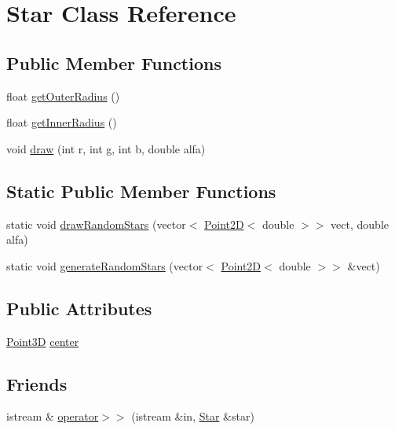 \hypertarget{class_star}{\section{Star Class Reference}
\label{class_star}
}
\subsection*{Public Member Functions}
\begin{DoxyCompactItemize}
\item 
float \hyperlink{class_star_a3270c6370a58a3cd1b3f208772928fd4}{get\+Outer\+Radius} ()
\item 
float \hyperlink{class_star_a7589c551056483d088f0c8e2ae56f182}{get\+Inner\+Radius} ()
\item 
void \hyperlink{class_star_a5b5a633e1411e3ba772a583d13455a77}{draw} (int r, int g, int b, double alfa)
\end{DoxyCompactItemize}
\subsection*{Static Public Member Functions}
\begin{DoxyCompactItemize}
\item 
static void \hyperlink{class_star_a5e8cf08bf8519faf9c6fe29db77c5b95}{draw\+Random\+Stars} (vector$<$ \hyperlink{class_point2_d}{Point2\+D}$<$ double $>$$>$ vect, double alfa)
\item 
static void \hyperlink{class_star_a5a45a1a26f35e13f54ca52baf64f6970}{generate\+Random\+Stars} (vector$<$ \hyperlink{class_point2_d}{Point2\+D}$<$ double $>$$>$ \&vect)
\end{DoxyCompactItemize}
\subsection*{Public Attributes}
\begin{DoxyCompactItemize}
\item 
\hyperlink{class_point3_d}{Point3\+D} \hyperlink{class_star_a56595bbf2da9c7b2de04be76f61d2e93}{center}
\end{DoxyCompactItemize}
\subsection*{Friends}
\begin{DoxyCompactItemize}
\item 
istream \& \hyperlink{class_star_ad3471c4d5d15b774543031939eda0f5d}{operator$>$$>$} (istream \&in, \hyperlink{class_star}{Star} \&star)
\end{DoxyCompactItemize}


